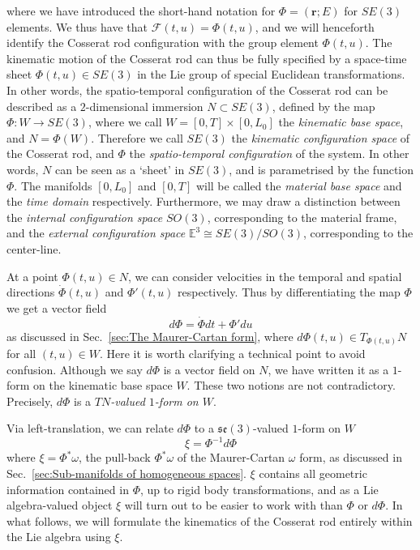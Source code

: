 where we have introduced the short-hand notation for $\Phi = (\mathbf{r} ; E)$ for $SE(3)$ elements. We thus have that $\mathcal{F}(t,u) = \Phi(t,u)$, and we will henceforth identify the Cosserat rod configuration with the group element $\Phi(t,u)$. The kinematic motion of the Cosserat rod can thus be fully specified by a space-time sheet $\Phi(t, u) \in SE(3)$ in the Lie group of special Euclidean transformations. In other words, the spatio-temporal configuration of the Cosserat rod can be described as a $2$-dimensional immersion $N \subset SE(3)$, defined by the map $\Phi : W \to SE(3)$, where we call $W = [0, T] \times [0, L_0]$ the \textit{kinematic base space}, and $N = \Phi(W)$. Therefore we call $SE(3)$ the \textit{kinematic configuration space} of the Cosserat rod, and $\Phi$ the \textit{spatio-temporal configuration} of the system. In other words, $N$ can be seen as a `sheet' in $SE(3)$, and is parametrised by the function $\Phi$. The manifolds $[0, L_0]$ and $[0, T]$ will be called the \textit{material base space} and the \textit{time domain} respectively. Furthermore, we may draw a distinction between the \textit{internal configuration space} $SO(3)$, corresponding to the material frame, and the \textit{external configuration space} $\mathbb{E}^3 \cong SE(3) / SO(3)$, corresponding to the center-line.

At a point $\Phi(t, u) \in N$, we can consider velocities in the temporal and spatial directions $\dot{\Phi}(t, u)$ and $\Phi'(t, u)$ respectively. Thus by differentiating the map $\Phi$ we get a vector field
\begin{equation}
d\Phi = \dot{\Phi} dt + \Phi' du
\end{equation}
as discussed in Sec.~\ref{sec:The Maurer-Cartan form}, where $d \Phi(t, u) \in T_{\Phi(t, u)} N$ for all $(t, u) \in W$. Here it is worth clarifying a technical point to avoid confusion. Although we say $d \Phi$ is a vector field on $N$, we have written it as a $1$-form on the kinematic base space $W$. These two notions are not contradictory. Precisely, $d\Phi$ is a \textit{$TN$-valued $1$-form on $W$}.

Via left-translation, we can relate $d \Phi$ to a $\mathfrak{se}(3)$-valued $1$-form on $W$
\begin{equation} \label{eq:xi from phi}
\xi = \Phi^{-1} d \Phi
\end{equation}
where $\xi = \Phi^* \omega$, the pull-back $\Phi^* \omega$ of the Maurer-Cartan $\omega$ form, as discussed in Sec.~\ref{sec:Sub-manifolds of homogeneous spaces}. $\xi$ contains all geometric information contained in $\Phi$, up to rigid body transformations, and as a Lie algebra-valued object $\xi$ will turn out to be easier to work with than $\Phi$ or $d \Phi$. In what follows, we will formulate the kinematics of the Cosserat rod entirely within the Lie algebra using $\xi$.

